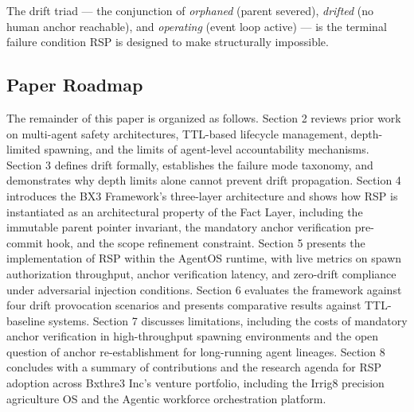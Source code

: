 The drift triad — the conjunction of \textit{orphaned} (parent severed), \textit{drifted} (no human anchor reachable), and \textit{operating} (event loop active) — is the terminal failure condition RSP is designed to make structurally impossible.

\subsection{Paper Roadmap}

The remainder of this paper is organized as follows. Section 2 reviews prior work on multi-agent safety architectures, TTL-based lifecycle management, depth-limited spawning, and the limits of agent-level accountability mechanisms. Section 3 defines drift formally, establishes the failure mode taxonomy, and demonstrates why depth limits alone cannot prevent drift propagation. Section 4 introduces the BX3 Framework's three-layer architecture and shows how RSP is instantiated as an architectural property of the Fact Layer, including the immutable parent pointer invariant, the mandatory anchor verification pre-commit hook, and the scope refinement constraint. Section 5 presents the implementation of RSP within the AgentOS runtime, with live metrics on spawn authorization throughput, anchor verification latency, and zero-drift compliance under adversarial injection conditions. Section 6 evaluates the framework against four drift provocation scenarios and presents comparative results against TTL-baseline systems. Section 7 discusses limitations, including the costs of mandatory anchor verification in high-throughput spawning environments and the open question of anchor re-establishment for long-running agent lineages. Section 8 concludes with a summary of contributions and the research agenda for RSP adoption across Bxthre3 Inc's venture portfolio, including the Irrig8 precision agriculture OS and the Agentic workforce orchestration platform.